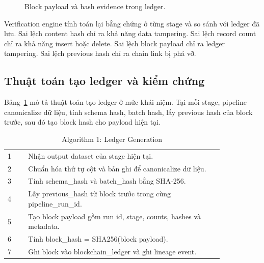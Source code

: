 \begin{figure}[t]
\centering
{}
\caption{Block payload và hash evidence trong ledger.}
\label{fig:block_structure}
\end{figure}

Verification engine tính toán lại bằng chứng ở từng stage và so sánh với ledger đã lưu. Sai lệch content hash chỉ ra khả năng data tampering. Sai lệch record count chỉ ra khả năng insert hoặc delete. Sai lệch block payload chỉ ra ledger tampering. Sai lệch previous hash chỉ ra chain link bị phá vỡ.

\subsection{Thuật toán tạo ledger và kiểm chứng}

Bảng~\ref{tab:algo_ledger} mô tả thuật toán tạo ledger ở mức khái niệm. Tại mỗi stage, pipeline canonicalize dữ liệu, tính schema hash, batch hash, lấy previous hash của block trước, sau đó tạo block hash cho payload hiện tại.

\begin{table}[t]
\caption{Algorithm 1: Ledger Generation}
\centering
\begin{tabular}{p{0.08\linewidth}p{0.76\linewidth}}
\toprule
1 & Nhận output dataset của stage hiện tại. \\
2 & Chuẩn hóa thứ tự cột và bản ghi để canonicalize dữ liệu. \\
3 & Tính schema\_hash và batch\_hash bằng SHA-256. \\
4 & Lấy previous\_hash từ block trước trong cùng pipeline\_run\_id. \\
5 & Tạo block payload gồm run id, stage, counts, hashes và metadata. \\
6 & Tính block\_hash = SHA256(block payload). \\
7 & Ghi block vào blockchain\_ledger và ghi lineage event. \\
\bottomrule
\end{tabular}
\label{tab:algo_ledger}
\end{table}

